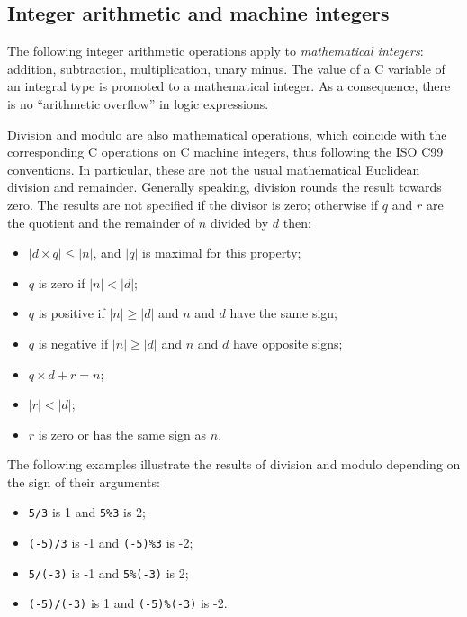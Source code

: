 \subsection{Integer arithmetic and machine integers}

The following integer arithmetic operations apply to
\emph{mathematical integers}: addition, subtraction, multiplication,
unary minus. The value of a C variable of an integral type is promoted
to a mathematical integer. As a consequence, there is no
``arithmetic overflow'' in logic expressions.

Division and modulo are also mathematical operations, which coincide
with the corresponding C operations on C machine integers, thus
following the ISO C99 conventions. In particular, these are not the
usual mathematical Euclidean division and remainder.
Generally speaking, division
rounds the result towards zero. The results are not specified if the
divisor is zero; otherwise if $q$ and $r$ are the quotient and the
remainder of $n$ divided by $d$ then:
\begin{itemize}
\item $|d\times q| \leq |n|$, and $|q|$ is maximal for this property;
\item $q$ is zero if $|n|<|d|$;
\item $q$ is positive if $|n|\geq|d|$ and $n$ and $d$ have the same sign;
\item $q$ is negative if $|n|\geq|d|$ and $n$ and $d$ have opposite signs;
\item $q\times d+r = n$;
\item $|r|<|d|$;
\item $r$ is zero or has the same sign as $n$.
\end{itemize}

\begin{example}
  The following examples illustrate the results of division and modulo
  depending on the sign of their arguments:
  \begin{itemize}
  \item \lstinline|5/3| is 1 and \lstinline|5%3| is 2;
  \item \lstinline|(-5)/3| is -1 and \lstinline|(-5)%3| is -2;
  \item \lstinline|5/(-3)| is -1 and \lstinline|5%(-3)| is 2;
  \item \lstinline|(-5)/(-3)| is 1 and \lstinline|(-5)%(-3)| is -2.
  \end{itemize}
\end{example}

